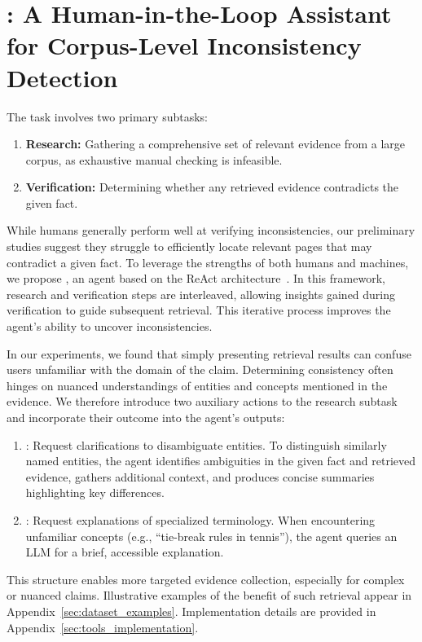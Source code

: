 \section{\system: A Human-in-the-Loop Assistant for Corpus-Level Inconsistency Detection}

The \task task involves two primary subtasks:

\begin{enumerate}
\item \textbf{Research:} Gathering a comprehensive set of relevant evidence from a large corpus, as exhaustive manual checking is infeasible.
\item \textbf{Verification:} Determining whether any retrieved evidence contradicts the given fact.
\end{enumerate}

While humans generally perform well at verifying inconsistencies, our preliminary studies suggest they struggle to efficiently locate relevant pages that may contradict a given fact. To leverage the strengths of both humans and machines, we propose \system, an agent based on the ReAct architecture~\citep{yao2022react}. In this framework, research and verification steps are interleaved, allowing insights gained during verification to guide subsequent retrieval. This iterative process improves the agent's ability to uncover inconsistencies.

In our experiments, we found that simply presenting retrieval results can confuse users unfamiliar with the domain of the claim. Determining consistency often hinges on nuanced understandings of entities and concepts mentioned in the evidence. We therefore introduce two auxiliary actions to the research subtask and incorporate their outcome into the agent's outputs:

\begin{enumerate}
\item {}:
Request clarifications to disambiguate entities.
To distinguish similarly named entities, the agent identifies ambiguities in the given fact and retrieved evidence, gathers additional context, and produces concise summaries highlighting key differences.
\item {}: Request explanations of specialized terminology. When encountering unfamiliar concepts (e.g., ``tie-break rules in tennis''), the agent queries an LLM for a brief, accessible explanation.
\end{enumerate}

This structure enables more targeted evidence collection, especially for complex or nuanced claims. Illustrative examples of the benefit of such retrieval appear in Appendix~\ref{sec:dataset_examples}. Implementation details are provided in Appendix~\ref{sec:tools_implementation}.

